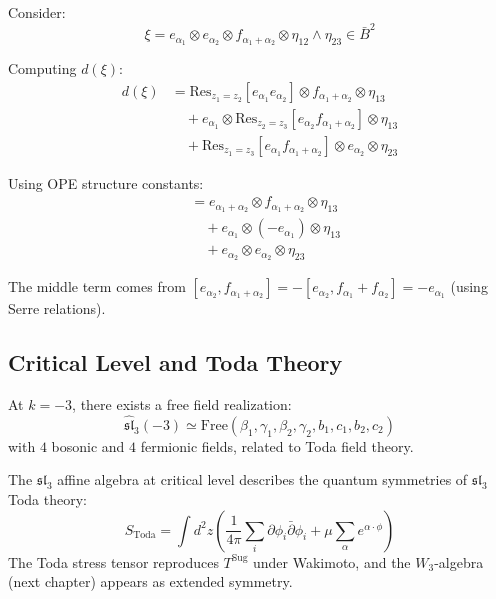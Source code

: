 \begin{computation}
Consider:
$$\xi = e_{\alpha_1} \otimes e_{\alpha_2} \otimes f_{\alpha_1+\alpha_2} \otimes \eta_{12} \wedge \eta_{23} \in \bar{B}^2$$

Computing $d(\xi)$:
\begin{align*}
d(\xi) &= \text{Res}_{z_1=z_2}[e_{\alpha_1} e_{\alpha_2}] \otimes f_{\alpha_1+\alpha_2} \otimes \eta_{13} \\
&\quad + e_{\alpha_1} \otimes \text{Res}_{z_2=z_3}[e_{\alpha_2} f_{\alpha_1+\alpha_2}] \otimes \eta_{13} \\
&\quad + \text{Res}_{z_1=z_3}[e_{\alpha_1} f_{\alpha_1+\alpha_2}] \otimes e_{\alpha_2} \otimes \eta_{23}
\end{align*}

Using OPE structure constants:
\begin{align*}
&= e_{\alpha_1+\alpha_2} \otimes f_{\alpha_1+\alpha_2} \otimes \eta_{13} \\
&\quad + e_{\alpha_1} \otimes (-e_{\alpha_1}) \otimes \eta_{13} \\
&\quad + e_{\alpha_2} \otimes e_{\alpha_2} \otimes \eta_{23}
\end{align*}

The middle term comes from $[e_{\alpha_2}, f_{\alpha_1+\alpha_2}] = -[e_{\alpha_2}, f_{\alpha_1}+f_{\alpha_2}] = -e_{\alpha_1}$ (using Serre relations).
\end{computation}

\subsection{Critical Level and Toda Theory}

\begin{theorem}
At $k = -3$, there exists a free field realization:
$$\widehat{\mathfrak{sl}}_3(-3) \simeq \text{Free}(\beta_1, \gamma_1, \beta_2, \gamma_2, b_1, c_1, b_2, c_2)$$
with $4$ bosonic and $4$ fermionic fields, related to Toda field theory.
\end{theorem}

\begin{remark}
The $\mathfrak{sl}_3$ affine algebra at critical level describes the quantum symmetries of $\mathfrak{sl}_3$ Toda theory:
$$S_{\text{Toda}} = \int d^2z \left(\frac{1}{4\pi}\sum_i \partial \phi_i \bar{\partial}\phi_i + \mu \sum_{\alpha} e^{\alpha \cdot \phi}\right)$$
The Toda stress tensor reproduces $T^{\text{Sug}}$ under Wakimoto, and the $W_3$-algebra (next chapter) appears as extended symmetry.
\end{remark}

